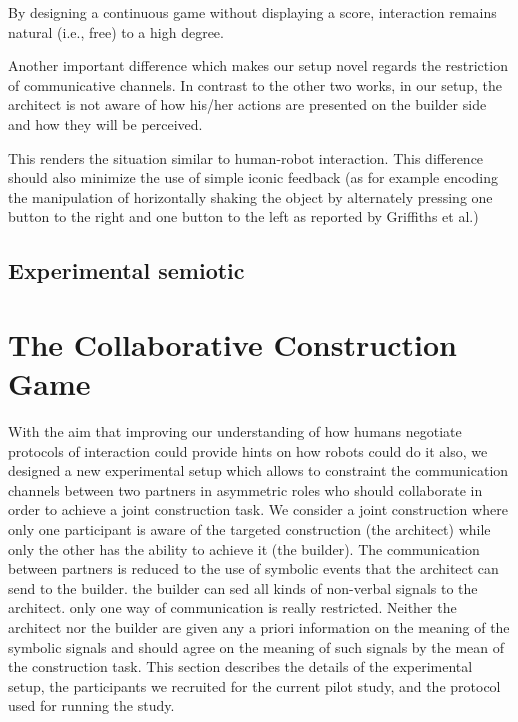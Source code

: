 By designing a continuous game without displaying a score, interaction remains natural (i.e., free) to a high degree. 

Another important difference which makes our setup novel regards the restriction of communicative channels. In contrast to the other two works, in our setup, the architect is not aware of how his/her actions are presented on the builder side and how they will be perceived. 

This renders the situation similar to human-robot interaction.
This difference should also minimize the use of simple iconic feedback (as for example encoding the manipulation of horizontally shaking the object by alternately pressing one button to the right and one button to the left as reported by Griffiths et al.)


\subsection{Experimental semiotic}

\section{The Collaborative Construction Game}

With the aim that improving our understanding of how humans negotiate protocols of interaction could provide hints on how robots could do it also, we designed a new experimental setup which allows to constraint the communication channels between two partners in asymmetric roles who should collaborate in order to achieve a joint construction task. 
We consider a joint construction where only one participant is aware of the targeted construction (the architect) while only the other has the ability to achieve it (the builder). The communication between partners is reduced to the use of symbolic events that the architect can send to the builder. 
the builder can sed all kinds of non-verbal signals to the architect. only one way of communication is really restricted. Neither the architect nor the builder are given any a priori information on the meaning of the symbolic signals and should agree on the meaning of such signals by the mean of the construction task.
This section describes the details of the experimental setup, the participants we recruited for the current pilot study, and the protocol used for running the study.

